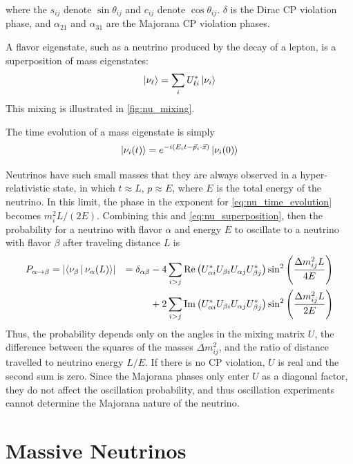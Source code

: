 \documentclass[herrin-thesis.tex]{subfiles}
\begin{document}
where the \(s_{ij}\) denote \(\sin\theta_{ij}\) and \(c_{ij}\) denote \(\cos\theta_{ij}\). \(\delta\) is the Dirac CP violation phase, and \(\alpha_{21}\) and \(\alpha_{31}\) are the Majorana CP violation phases.

 A flavor eigenstate, such as a neutrino produced by the decay of a lepton, is a superposition of mass eigenstates:
 \begin{equation}
 \Ket{\nu_{\ell}} = \sum_{i}U_{\ell i}^{*} \Ket{\nu_i}
 \label{eq:nu_superposition}
 \end{equation}
 This mixing is illustrated in \cref{fig:nu_mixing}.
 
 The time evolution of a mass eigenstate is simply
 \begin{equation}
 \Ket{\nu_{i}(t)} = e^{-i(E_i t - \vec{p}_i\cdot\vec{x})}\Ket{\nu_i(0)}
 \label{eq:nu_time_evolution}
 \end{equation}

Neutrinos have such small masses that they are always observed in a hyper-relativistic state, in which \(t\approx L\), \(p\approx E\), where \(E\) is the total energy of the neutrino. In this limit, the phase in the exponent for \cref{eq:nu_time_evolution} becomes \(m_i^2 L/(2E)\). Combining this and \cref{eq:nu_superposition}, then the probability for a neutrino with flavor \(\alpha\) and energy \(E\) to oscillate to a neutrino with flavor \(\beta\) after traveling distance \(L\) is
\begin{align}
P_{\alpha\rightarrow\beta}	& = \left | \Braket{\nu_\beta | \nu_\alpha(L)} \right |	& = \delta_{\alpha\beta}	& - 4\sum_{i>j}\text{Re}\left(U_{\alpha i}^{*}U_{\beta i}U_{\alpha j}U_{\beta j}^{*}\right)\sin^2\left(\frac{\Delta m_{ij}^2 L}{4 E}\right)\nonumber\\
						&										&					& +2\sum_{i>j}\text{Im}\left(U_{\alpha i}^{*}U_{\beta i}U_{\alpha j}U_{\beta j}^{*}\right)\sin^2\left(\frac{\Delta m_{ij}^2 L}{2 E}\right)
\label{eq:nu_oscillation_prob}
\end{align}
Thus, the probability depends only on the angles in the mixing matrix \(U\), the difference between the squares of the masses \(\Delta m_{ij}^2\), and the ratio of distance travelled to neutrino energy \(L/E\). If there is no CP violation, \(U\) is real and the second sum is zero. Since the Majorana phases only enter \(U\) as a diagonal factor, they do not affect the oscillation probability, and thus oscillation experiments cannot determine the Majorana nature of the neutrino.

\section{Massive Neutrinos}
\end{document}
